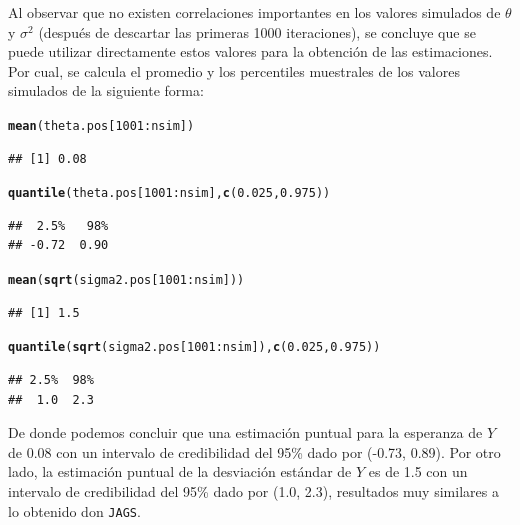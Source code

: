 \documentclass[10pt,openright]{book}\usepackage[]{graphicx}\usepackage[]{color}
\makeatletter
\newcommand{\hlnum}[1]{\textcolor[rgb]{0.686,0.059,0.569}{#1}}%
\newcommand{\hlopt}[1]{\textcolor[rgb]{0,0,0}{#1}}%
\newcommand{\hlstd}[1]{\textcolor[rgb]{0.345,0.345,0.345}{#1}}%
\newcommand{\hlkwd}[1]{\textcolor[rgb]{0.737,0.353,0.396}{\textbf{#1}}}%
\newenvironment{kframe}{%
 \def\at@end@of@kframe{}%
 \ifinner\ifhmode%
  \def\at@end@of@kframe{\end{minipage}}%
  \begin{minipage}{\columnwidth}%
 \fi\fi%
 \def\FrameCommand##1{\hskip\@totalleftmargin \hskip-\fboxsep
 \colorbox{shadecolor}{##1}\hskip-\fboxsep
     \hskip-\linewidth \hskip-\@totalleftmargin \hskip\columnwidth}%
 \MakeFramed {\advance\hsize-\width
   \@totalleftmargin\z@ \linewidth\hsize
   \@setminipage}}%
 {\par\unskip\endMakeFramed%
 \at@end@of@kframe}
\newenvironment{knitrout}{}{} %
\makeatother
\begin{document}
\begin{Eje}
\begin{knitrout}
\end{knitrout}
Al observar que no existen correlaciones importantes en los valores simulados de $\theta$ y $\sigma^2$ (despu\'es de descartar las primeras 1000 iteraciones), se concluye que se puede utilizar directamente estos valores para la obtenci\'on de las estimaciones. Por cual, se calcula el promedio y los percentiles muestrales de los valores simulados de la siguiente forma:
\begin{knitrout}
\color{fgcolor}\begin{kframe}
\begin{alltt}
\hlkwd{mean}\hlstd{(theta.pos[}\hlnum{1001}\hlopt{:}\hlstd{nsim])}
\end{alltt}
\begin{verbatim}
## [1] 0.08
\end{verbatim}
\begin{alltt}
\hlkwd{quantile}\hlstd{(theta.pos[}\hlnum{1001}\hlopt{:}\hlstd{nsim],} \hlkwd{c}\hlstd{(}\hlnum{0.025}\hlstd{,}\hlnum{0.975}\hlstd{))}
\end{alltt}
\begin{verbatim}
##  2.5%   98% 
## -0.72  0.90
\end{verbatim}
\begin{alltt}
\hlkwd{mean}\hlstd{(}\hlkwd{sqrt}\hlstd{(sigma2.pos[}\hlnum{1001}\hlopt{:}\hlstd{nsim]))}
\end{alltt}
\begin{verbatim}
## [1] 1.5
\end{verbatim}
\begin{alltt}
\hlkwd{quantile}\hlstd{(}\hlkwd{sqrt}\hlstd{(sigma2.pos[}\hlnum{1001}\hlopt{:}\hlstd{nsim]),} \hlkwd{c}\hlstd{(}\hlnum{0.025}\hlstd{,}\hlnum{0.975}\hlstd{))}
\end{alltt}
\begin{verbatim}
## 2.5%  98% 
##  1.0  2.3
\end{verbatim}
\end{kframe}
\end{knitrout}

De donde podemos concluir que una estimaci\'on puntual para la esperanza de $Y$ de 0.08 con un intervalo de credibilidad del 95\% dado por (-0.73, 0.89). Por otro lado, la estimaci\'on puntual de la desviaci\'on est\'andar de $Y$ es de 1.5 con un intervalo de credibilidad del 95\% dado por (1.0, 2.3), resultados muy similares a lo obtenido don \verb'JAGS'. 


\end{Eje}
\end{document}
